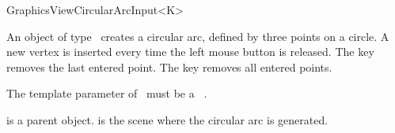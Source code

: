 \begin{ccRefClass}[Qt::]{GraphicsViewCircularArcInput<K>}

\ccDefinition
An object of type \ccRefName\ creates a circular arc, defined by three points on a circle. A new 
vertex is inserted every time the left mouse button is released.
The  key removes the last entered point. The  
key removes all entered points.



\ccParameters

The template parameter of \ccRefName\ must be a \cgal\ . 

\ccInheritsFrom
{}

\ccGlue

\ccCreation
{}

{ is a parent object.  is the scene where the circular arc is generated.}



\end{ccRefClass}







